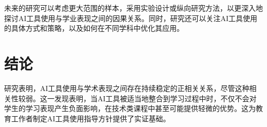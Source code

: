 \documentclass[a4paper,12pt]{article}
\begin{document}
未来的研究可以考虑更大范围的样本，采用实验设计或纵向研究方法，以更深入地探讨AI工具使用与学业表现之间的因果关系。同时，研究还可以关注AI工具使用的具体方式和策略，以及如何在不同学科中优化其应用。

\section{结论}
研究表明，AI工具使用与学术表现之间存在持续稳定的正相关关系，尽管这种相关性较弱。这一发现表明，当AI工具被适当地整合到学习过程中时，不仅不会对学生的学习表现产生负面影响，在技术类课程中甚至可能提供轻微的优势。这为教育工作者制定AI工具使用指导方针提供了实证基础。

\end{document}
